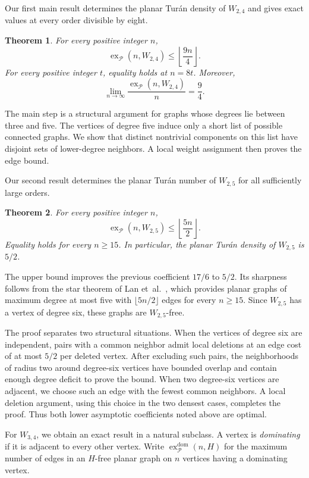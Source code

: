 \documentclass[11pt,a4paper]{article}
\newtheorem{theorem}{Theorem}[section]
\theoremstyle{remark}
\newcommand{\ex}{\operatorname{ex}}
\newcommand{\PP}{\mathcal P}
\begin{document}
Our first main result determines the planar Tur\'an density of $W_{2,4}$ and gives exact values at every order divisible by eight.

\begin{theorem}\label{thm:w24}
For every positive integer $n$,
\[
\ex_{\PP}(n,W_{2,4})\le\left\lfloor\frac{9n}{4}\right\rfloor.
\]
For every positive integer $t$, equality holds at $n=8t$. Moreover,
\[
\lim_{n\to\infty}\frac{\ex_{\PP}(n,W_{2,4})}{n}=\frac94.
\]
\end{theorem}

The main step is a structural argument for graphs whose degrees lie between three and five. The vertices of degree five induce only a short list of possible connected graphs. We show that distinct nontrivial components on this list have disjoint sets of lower-degree neighbors. A local weight assignment then proves the edge bound.

Our second result determines the planar Tur\'an number of $W_{2,5}$ for all sufficiently large orders.


\begin{theorem}\label{thm:w25}
For every positive integer $n$,
\[
\ex_{\PP}(n,W_{2,5})\le\left\lfloor\frac{5n}{2}\right\rfloor.
\]
Equality holds for every $n\ge15$. In particular, the planar Tur\'an density of $W_{2,5}$ is $5/2$.
\end{theorem}


The upper bound improves the previous coefficient $17/6$ to $5/2$. Its sharpness follows from the star theorem of Lan et~al.~\cite[Theorem~6]{LanShiSong2019}, which provides planar graphs of maximum degree at most five with $\lfloor5n/2\rfloor$ edges for every $n\ge15$. Since $W_{2,5}$ has a vertex of degree six, these graphs are $W_{2,5}$-free.

The proof separates two structural situations. When the vertices of degree six are independent, pairs with a common neighbor admit local deletions at an edge cost of at most $5/2$ per deleted vertex. After excluding such pairs, the neighborhoods of radius two around degree-six vertices have bounded overlap and contain enough degree deficit to prove the bound. When two degree-six vertices are adjacent, we choose such an edge with the fewest common neighbors. A local deletion argument, using this choice in the two densest cases, completes the proof. Thus both lower asymptotic coefficients noted above are optimal.

For $W_{3,4}$, we obtain an exact result in a natural subclass. A vertex is \emph{dominating} if it is adjacent to every other vertex. Write $\ex^{\mathrm{dom}}_{\PP}(n,H)$ for the maximum number of edges in an $H$-free planar graph on $n$ vertices having a dominating vertex.
\end{document}
